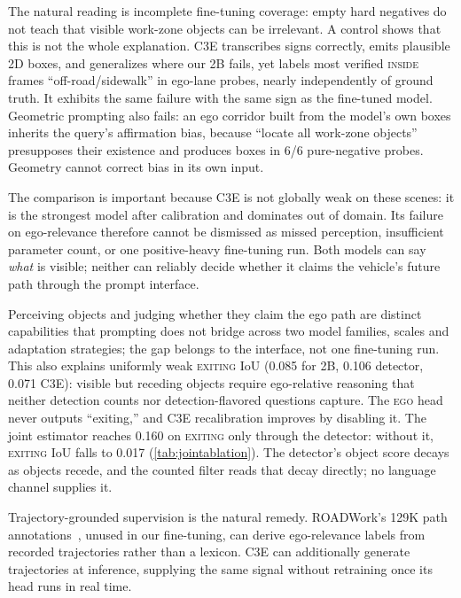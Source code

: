 \documentclass[journal]{IEEEtran}
\begin{document}
The natural reading is incomplete fine-tuning coverage: empty hard negatives do not teach that visible work-zone objects can be irrelevant.  A control shows that this is not the whole explanation.  C3E transcribes signs correctly, emits plausible 2D boxes, and generalizes where our 2B fails, yet labels most verified \textsc{inside} frames ``off-road/sidewalk'' in ego-lane probes, nearly independently of ground truth.  It exhibits the same failure with the same sign as the fine-tuned model.  Geometric prompting also fails: an ego corridor built from the model's own boxes inherits the query's affirmation bias, because ``locate all work-zone objects'' presupposes their existence and produces boxes in 6/6 pure-negative probes.  Geometry cannot correct bias in its own input.

The comparison is important because C3E is not globally weak on these scenes: it is the strongest model after calibration and dominates out of domain.  Its failure on ego-relevance therefore cannot be dismissed as missed perception, insufficient parameter count, or one positive-heavy fine-tuning run.  Both models can say \emph{what} is visible; neither can reliably decide whether it claims the vehicle's future path through the prompt interface.

Perceiving objects and judging whether they claim the ego path are distinct capabilities that prompting does not bridge across two model families, scales and adaptation strategies; the gap belongs to the interface, not one fine-tuning run.  This also explains uniformly weak \textsc{exiting} IoU (0.085 for 2B, 0.106 detector, 0.071 C3E): visible but receding objects require ego-relative reasoning that neither detection counts nor detection-flavored questions capture.  The \textsc{ego} head never outputs ``exiting,'' and C3E recalibration improves by disabling it.  The joint estimator reaches 0.160 on \textsc{exiting} only through the detector: without it, \textsc{exiting} IoU falls to 0.017 (\cref{tab:jointablation}).  The detector's object score decays as objects recede, and the counted filter reads that decay directly; no language channel supplies it.

Trajectory-grounded supervision is the natural remedy.  ROADWork's 129K path annotations~\cite{ghosh2025roadwork}, unused in our fine-tuning, can derive ego-relevance labels from recorded trajectories rather than a lexicon.  C3E can additionally generate trajectories at inference, supplying the same signal without retraining once its head runs in real time.
\end{document}

